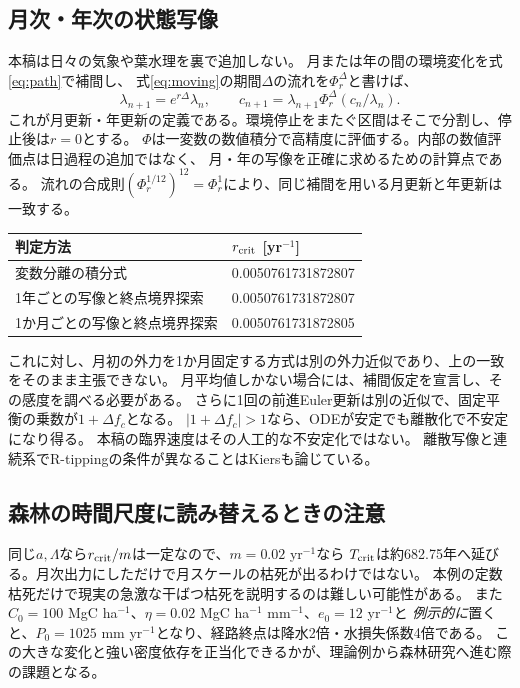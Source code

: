 \documentclass[a4paper,11pt]{ltjsarticle}
\begin{document}
\subsection{月次・年次の状態写像}
本稿は日々の気象や葉水理を裏で追加しない。
月または年の間の環境変化を式\eqref{eq:path}で補間し、
式\eqref{eq:moving}の期間$\Delta$の流れを$\Phi_r^\Delta$と書けば、
\begin{equation}\boxed{
\lambda_{n+1}=e^{r\Delta}\lambda_n,\qquad
c_{n+1}=\lambda_{n+1}\Phi_r^\Delta(c_n/\lambda_n).
}\label{eq:map}
\end{equation}
これが月更新・年更新の定義である。環境停止をまたぐ区間はそこで分割し、停止後は$r=0$とする。
$\Phi$は一変数の数値積分で高精度に評価する。内部の数値評価点は日過程の追加ではなく、
月・年の写像を正確に求めるための計算点である。
流れの合成則$(\Phi_r^{1/12})^{12}=\Phi_r^1$により、同じ補間を用いる月更新と年更新は一致する。
\begin{center}
\begin{tabular}{ll}
\toprule 判定方法 & $r_{\rm crit}$ [yr$^{-1}$]\\\midrule
変数分離の積分式 & 0.0050761731872807\\
1年ごとの写像と終点境界探索 & 0.0050761731872807\\
1か月ごとの写像と終点境界探索 & 0.0050761731872805\\\bottomrule
\end{tabular}
\end{center}
これに対し、月初の外力を1か月固定する方式は別の外力近似であり、上の一致をそのまま主張できない。
月平均値しかない場合には、補間仮定を宣言し、その感度を調べる必要がある。
さらに1回の前進Euler更新は別の近似で、固定平衡の乗数が$1+\Delta f_c$となる。
$|1+\Delta f_c|>1$なら、ODEが安定でも離散化で不安定になり得る。
本稿の臨界速度はその人工的な不安定化ではない。
離散写像と連続系でR-tippingの条件が異なることはKiers\cite{kiers}も論じている。

\subsection{森林の時間尺度に読み替えるときの注意}
同じ$a,\Lambda$なら$r_{\rm crit}/m$は一定なので、$m=0.02$ yr$^{-1}$なら
$T_{\rm crit}$は約682.75年へ延びる。月次出力にしただけで月スケールの枯死が出るわけではない。
本例の定数枯死だけで現実の急激な干ばつ枯死を説明するのは難しい可能性がある。
また$C_0=100$ MgC ha$^{-1}$、$\eta=0.02$ MgC ha$^{-1}$ mm$^{-1}$、$e_0=12$ yr$^{-1}$と
\emph{例示的に}置くと、$P_0=1025$ mm yr$^{-1}$となり、経路終点は降水2倍・水損失係数4倍である。
この大きな変化と強い密度依存を正当化できるかが、理論例から森林研究へ進む際の課題となる。
\end{document}
